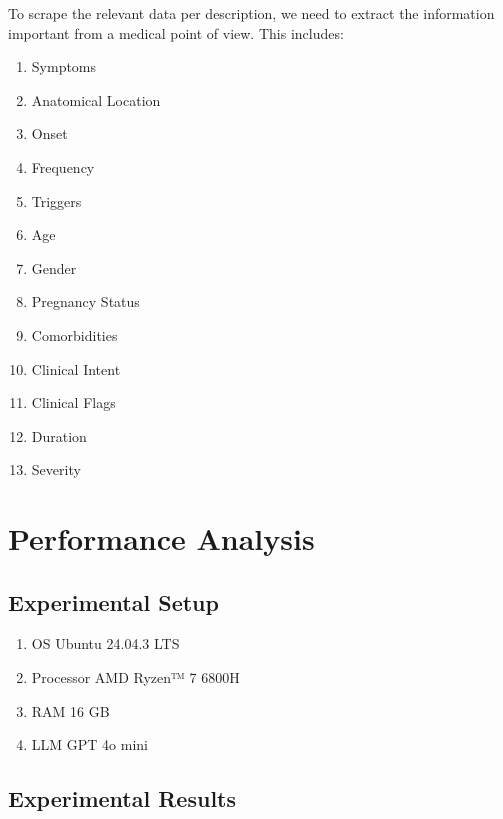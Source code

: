 \documentclass[conference, anonymous]{IEEEtran}
\begin{document}
To scrape the relevant data per description, we need to extract the information important from a medical point of view. This includes:
\begin{enumerate}
    \item Symptoms
    \item Anatomical Location
    \item Onset
    \item Frequency
    \item Triggers
    \item Age
    \item Gender
    \item Pregnancy Status
    \item Comorbidities
    \item Clinical Intent
    \item Clinical Flags
    \item Duration
    \item Severity

\end{enumerate}

\section{Performance Analysis}
\label{sec: performance-analysis}

\subsection{Experimental Setup}
\begin{enumerate}
    \item OS Ubuntu 24.04.3 LTS
    \item Processor AMD Ryzen™ 7 6800H 
    \item RAM 16 GB
    \item LLM GPT 4o mini
\end{enumerate}

\subsection{Experimental Results}
\end{document}
